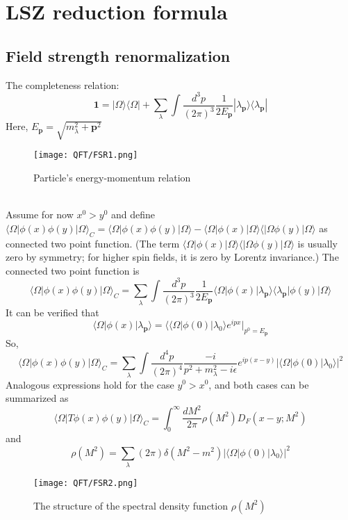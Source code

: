 \section{LSZ reduction formula}
\subsection{Field strength renormalization}
\noindent
The completeness relation:
\[\bm{1} = |\Omega\rangle\langle\Omega| +  \sum_{\lambda} \int \frac{d^3p}{(2\pi)^3} \frac{1}{2E_{\bm{p}}} |\lambda_{\bm{p}}\rangle\langle\lambda_{\bm{p}}|\]
Here, $E_{\bm{p}} = \sqrt{m_{\lambda}^2 + \bm{p}^2}$\\
\begin{figure}[!h]
\centering
\texttt{[image: QFT/FSR1.png]}
\caption{Particle's energy-momentum relation}
\end{figure}
\\
Assume for now $x^0 > y^0$ and define $\langle \Omega | \phi(x) \phi(y) | \Omega \rangle_{C} = \langle \Omega | \phi(x) \phi(y) | \Omega \rangle - \langle \Omega | \phi(x)| \Omega \rangle \langle | \Omega \phi(y) | \Omega \rangle$ as connected two point function. (The term $\langle \Omega | \phi(x)| \Omega \rangle \langle | \Omega \phi(y) | \Omega \rangle$ is usually zero by symmetry; for higher spin fields, it is zero by Lorentz invariance.) The connected two point function is
\[\langle \Omega | \phi(x) \phi(y) | \Omega \rangle_{C} = \sum_{\lambda} \int \frac{d^3p}{(2\pi)^3} \frac{1}{2E_{\bm{p}}} \langle \Omega | \phi(x) |\lambda_{\bm{p}}\rangle\langle\lambda_{\bm{p}}| \phi(y) | \Omega \rangle\]
It can be verified that
\[\langle \Omega | \phi(x) |\lambda_{\bm{p}}\rangle = \langle \langle \Omega | \phi(0) | \lambda_0 \rangle e^{ipx} |_{p^0 = E_{\bm{p}}}\]
So,
\[\langle \Omega | \phi(x) \phi(y) | \Omega \rangle_C = \sum_{\lambda} \int \frac{d^4p}{(2\pi)^4} \frac{-i}{p^2 + m_{\lambda}^2 -i\epsilon} e^{ip(x-y)} |\langle \Omega | \phi(0) | \lambda_0 \rangle|^2\]
Analogous expressions hold for the case $y^0 > x^0$, and both cases can be summarized as
\[\langle \Omega | T \phi(x) \phi(y) | \Omega \rangle_C = \int_0^{\infty} \frac{dM^2}{2\pi} \rho(M^2) D_F(x-y;M^2)\]
and 
\[\rho(M^2) = \sum_{\lambda} (2\pi) \delta(M^2-m^2)|\langle \Omega | \phi(0) | \lambda_0 \rangle|^2 \]
\begin{figure}[!h]
\centering
\texttt{[image: QFT/FSR2.png]}
\caption{The structure of the spectral density function $\rho(M^2)$}
\end{figure}\\
